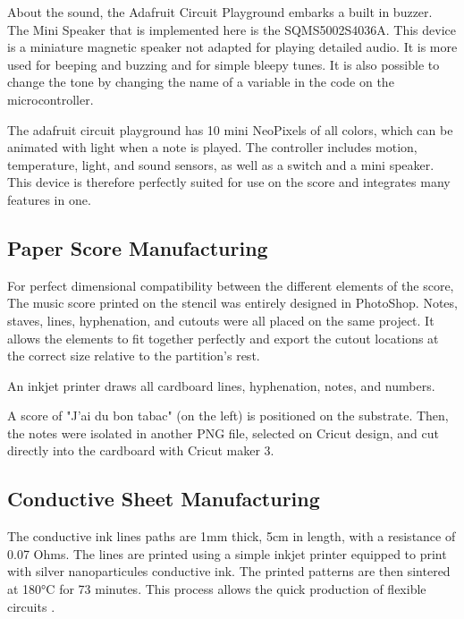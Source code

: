 About the sound, the Adafruit Circuit Playground embarks a built in buzzer. The Mini Speaker that is implemented here is the SQMS5002S4036A. This device is a miniature magnetic speaker not adapted for playing detailed audio. It is more used for beeping and buzzing and for simple bleepy tunes. It is also possible to change the tone by changing the name of a variable in the code on the microcontroller.

The adafruit circuit playground has 10 mini NeoPixels of all colors, which can be animated with light when a note is played. The controller includes motion, temperature, light, and sound sensors, as well as a switch and a mini speaker. This device is therefore perfectly suited for use on the score and integrates many features in one.

\subsection{Paper Score Manufacturing}

For perfect dimensional compatibility between the different elements of the score, The music score printed on the stencil was entirely designed in PhotoShop. Notes, staves, lines, hyphenation, and cutouts were all placed on the same project. It allows the elements to fit together perfectly and export the cutout locations at the correct size relative to the partition's rest.

An inkjet printer draws all cardboard lines, hyphenation, notes, and numbers.

A score of "J'ai du bon tabac" (on the left) is positioned on the substrate. Then, the notes were isolated in another PNG file, selected on Cricut design, and cut directly into the cardboard with Cricut maker 3.


\subsection{Conductive Sheet Manufacturing}

The conductive ink lines paths are 1mm thick, 5cm in length, with a resistance of 0.07 Ohms. The lines are printed using a simple inkjet printer equipped to print with silver nanoparticules conductive ink. The printed patterns are then sintered at 180°C for 73 minutes. This process allows the quick production of flexible circuits \cite{khan2019soft}.

